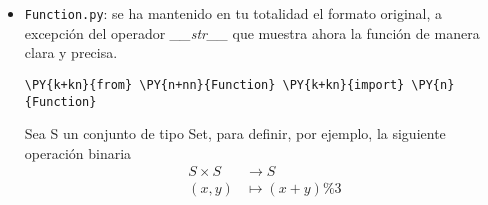 \begin{itemize}
\begin{itemize}
\begin{tcolorbox}[breakable, size=fbox, boxrule=.5pt, pad at break*=1mm, opacityfill=0]
\begin{Verbatim}[commandchars=\\\{\}]
[\{1\}, \{2\}, \{3\}, \{1, 2\}, \{1, 3\}, \{2, 3\}, \{1, 2, 3\}]
\end{Verbatim}
\end{tcolorbox}
        
    \begin{tcolorbox}[breakable, size=fbox, boxrule=1pt, pad at break*=1mm,colback=cellbackground, colframe=cellborder]
\begin{Verbatim}[commandchars=\\\{\}]
\PY{n}{A}\PY{o}{.}\PY{n}{subsets}\PY{p}{(}\PY{l+m+mi}{2}\PY{p}{)}
\end{Verbatim}
\end{tcolorbox}

        \begin{tcolorbox}[breakable, size=fbox, boxrule=.5pt, pad at break*=1mm, opacityfill=0]
\begin{Verbatim}[commandchars=\\\{\}]
[\{1, 2\}, \{1, 3\}, \{2, 3\}]
\end{Verbatim}
\end{tcolorbox}
        
        
    \end{itemize}
  
  
\newpage
\item  \texttt{Function.py}: se ha mantenido en tu totalidad el formato
  original, a excepción del operador \textit{\_\_str\_\_} que muestra ahora
  la función de manera clara y precisa.


    \begin{tcolorbox}[breakable, size=fbox, boxrule=1pt, pad at break*=1mm,colback=cellbackground, colframe=cellborder]
\begin{Verbatim}[commandchars=\\\{\}]
\PY{k+kn}{from} \PY{n+nn}{Function} \PY{k+kn}{import} \PY{n}{Function}
\end{Verbatim}
\end{tcolorbox}

    Sea S un conjunto de tipo Set, para definir, por ejemplo, la siguiente operación binaria
    \begin{align*}
        S \times S &\rightarrow S \\
            (x,y) & \mapsto (x+y)\%3 
    \end{align*}


\end{itemize}
